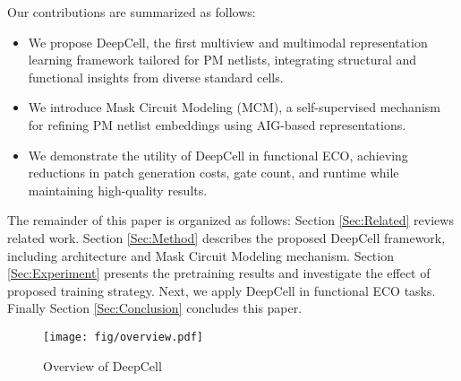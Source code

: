Our contributions are summarized as follows:
\begin{itemize}
\iffalse
    \item We propose a circuit representation learning framework, DeepCell, designed to learn a general representation of post-mapping netlists. Leveraging a novel netlist feature extraction mechanism and model architecture, DeepCell generates cell-level embeddings that effectively capture functionality across arbitrary technology libraries. 
    \item To the best of our knowledge, DeepCell is the first work to incorporate multiview learning in the field of circuit representation learning. We introduce Mask Circuit Modeling (MCM), which masks cells in the PM netlist and reconstructs their embeddings using the view derived from the AIG. 
    \item We employ DeepCell in a practical EDA application, Functional ECO. By incorporating DeepCell, the ECO solution can reduces low-quality candidate signals, reduces runtime by 15\%, reduce the cost and gates on the generated patches by an average of 6\% and 15\%, respectively.
\fi 
    \item We propose DeepCell, the first multiview and multimodal representation learning framework tailored for PM netlists, integrating structural and functional insights from diverse standard cells.
    \item We introduce Mask Circuit Modeling (MCM), a self-supervised mechanism for refining PM netlist embeddings using AIG-based representations.
    \item We demonstrate the utility of DeepCell in functional ECO, achieving reductions in patch generation costs, gate count, and runtime while maintaining high-quality results.

\end{itemize}

The remainder of this paper is organized as follows: Section \ref{Sec:Related} reviews related work. Section \ref{Sec:Method} describes the proposed DeepCell framework, including architecture and Mask Circuit Modeling mechanism. Section \ref{Sec:Experiment} presents the pretraining results and investigate the effect of proposed training strategy. Next, we apply DeepCell in functional ECO tasks. Finally Section \ref{Sec:Conclusion} concludes this paper. 

\begin{figure*}[!t]
    \centering
    \texttt{[image: fig/overview.pdf]}
\vspace{-5pt}
    
    \caption{Overview of DeepCell}
    \label{fig:overview}
\vspace{-15pt}
    
\end{figure*}
